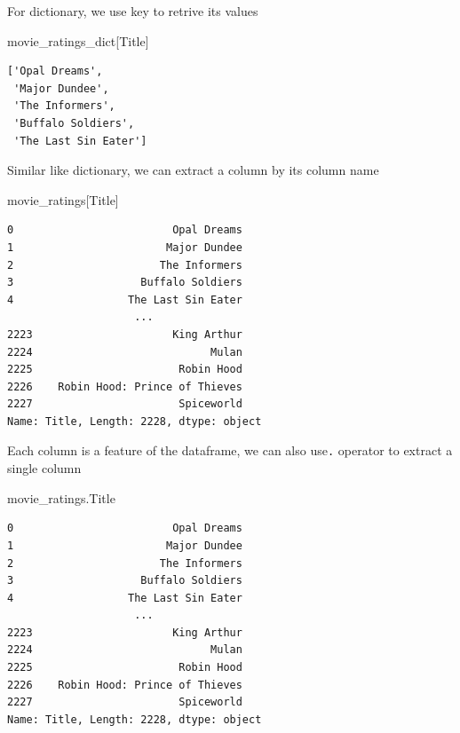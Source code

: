 \documentclass[
  letterpaper,
  DIV=11,
  numbers=noendperiod]{scrreprt}
\newenvironment{Shaded}{\begin{snugshade}}{\end{snugshade}}
\newcommand{\NormalTok}[1]{\textcolor[rgb]{0.00,0.23,0.31}{#1}}
\newcommand{\StringTok}[1]{\textcolor[rgb]{0.13,0.47,0.30}{#1}}
\begin{document}
For dictionary, we use key to retrive its values

\begin{Shaded}
\begin{Highlighting}[]
\NormalTok{movie\_ratings\_dict[}\StringTok{\textquotesingle{}Title\textquotesingle{}}\NormalTok{]}
\end{Highlighting}
\end{Shaded}

\begin{verbatim}
['Opal Dreams',
 'Major Dundee',
 'The Informers',
 'Buffalo Soldiers',
 'The Last Sin Eater']
\end{verbatim}

Similar like dictionary, we can extract a column by its column name

\begin{Shaded}
\begin{Highlighting}[]
\NormalTok{movie\_ratings[}\StringTok{\textquotesingle{}Title\textquotesingle{}}\NormalTok{]}
\end{Highlighting}
\end{Shaded}

\begin{verbatim}
0                         Opal Dreams
1                        Major Dundee
2                       The Informers
3                    Buffalo Soldiers
4                  The Last Sin Eater
                    ...              
2223                      King Arthur
2224                            Mulan
2225                       Robin Hood
2226    Robin Hood: Prince of Thieves
2227                       Spiceworld
Name: Title, Length: 2228, dtype: object
\end{verbatim}

Each column is a feature of the dataframe, we can also use\texttt{.}
operator to extract a single column

\begin{Shaded}
\begin{Highlighting}[]
\NormalTok{movie\_ratings.Title}
\end{Highlighting}
\end{Shaded}

\begin{verbatim}
0                         Opal Dreams
1                        Major Dundee
2                       The Informers
3                    Buffalo Soldiers
4                  The Last Sin Eater
                    ...              
2223                      King Arthur
2224                            Mulan
2225                       Robin Hood
2226    Robin Hood: Prince of Thieves
2227                       Spiceworld
Name: Title, Length: 2228, dtype: object
\end{verbatim}
\end{document}
